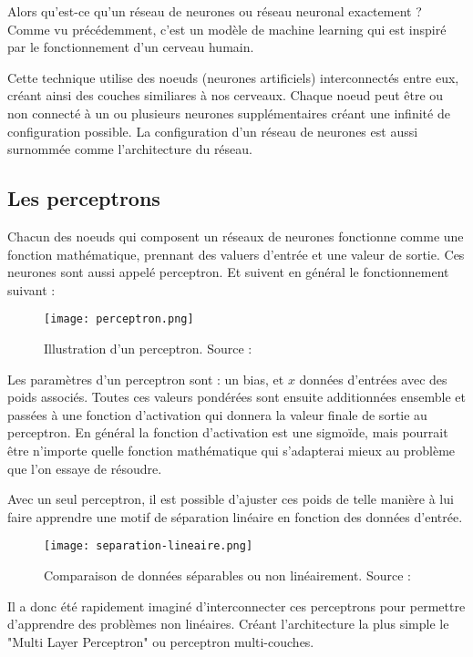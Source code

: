 Alors qu'est-ce qu'un réseau de neurones ou réseau neuronal exactement ?
Comme vu précédemment, c'est un modèle de machine learning qui est inspiré par le fonctionnement d'un cerveau humain.

Cette technique utilise des noeuds (neurones artificiels) interconnectés entre eux, créant ainsi des couches similiares à nos cerveaux.
Chaque noeud peut être ou non connecté à un ou plusieurs neurones supplémentaires créant une infinité de configuration possible.
La configuration d'un réseau de neurones est aussi surnommée comme l'architecture du réseau.

\subsection{Les perceptrons}

Chacun des noeuds qui composent un réseaux de neurones fonctionne comme une fonction mathématique, prennant des valuers d'entrée et une valeur de sortie.
Ces neurones sont aussi appelé perceptron. Et suivent en général le fonctionnement suivant :

\begin{figure}[tbph!]
	\centering
	\texttt{[image: perceptron.png]}
	\caption[Illustration d'un perceptron]{Illustration d'un perceptron. Source : \cite{PerceptronImage}}
\end{figure}

Les paramètres d'un perceptron sont : un bias, et $x$ données d'entrées avec des poids associés. Toutes ces valeurs pondérées sont ensuite additionnées ensemble
et passées à une fonction d'activation qui donnera la valeur finale de sortie au perceptron. En général la fonction d'activation est une sigmoïde, 
mais pourrait être n'importe quelle fonction mathématique qui s'adapterai mieux au problème que l'on essaye de résoudre.

Avec un seul perceptron, il est possible d'ajuster ces poids de telle manière à lui faire apprendre une motif de
séparation linéaire en fonction des données d'entrée. 

\begin{figure}[tbph!]
	\centering
	\texttt{[image: separation-lineaire.png]}
	\caption[Comparaison de données séparables ou non linéairement]{Comparaison de données séparables ou non linéairement. Source : \cite{LinearSeparation}}
\end{figure}

Il a donc été rapidement imaginé d'interconnecter ces perceptrons pour permettre d'apprendre des problèmes non linéaires. 
Créant l'architecture la plus simple le "Multi Layer Perceptron" ou perceptron multi-couches.

